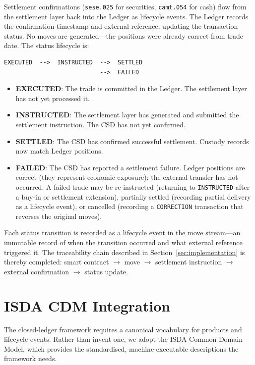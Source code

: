 \documentclass[11pt,a4paper]{article}
\begin{document}
Settlement confirmations (\texttt{sese.025} for securities, \texttt{camt.054} for cash) flow from the settlement layer back into the Ledger as lifecycle events. The Ledger records the confirmation timestamp and external reference, updating the transaction status. No moves are generated---the positions were already correct from trade date. The status lifecycle is:

\begin{lstlisting}
EXECUTED  -->  INSTRUCTED  -->  SETTLED
                           -->  FAILED
\end{lstlisting}

\begin{itemize}[nosep]
\item \textbf{EXECUTED}: The trade is committed in the Ledger. The settlement layer has not yet processed it.
\item \textbf{INSTRUCTED}: The settlement layer has generated and submitted the settlement instruction. The CSD has not yet confirmed.
\item \textbf{SETTLED}: The CSD has confirmed successful settlement. Custody records now match Ledger positions.
\item \textbf{FAILED}: The CSD has reported a settlement failure. Ledger positions are correct (they represent economic exposure); the external transfer has not occurred. A failed trade may be re-instructed (returning to \texttt{INSTRUCTED} after a buy-in or settlement extension), partially settled (recording partial delivery as a lifecycle event), or cancelled (recording a \texttt{CORRECTION} transaction that reverses the original moves).
\end{itemize}

\noindent Each status transition is recorded as a lifecycle event in the move stream---an immutable record of when the transition occurred and what external reference triggered it. The traceability chain described in Section~\ref{sec:implementation} is thereby completed: smart contract $\to$ move $\to$ settlement instruction $\to$ external confirmation $\to$ status update.

\clearpage
\section{ISDA CDM Integration}
\label{sec:cdm}

The closed-ledger framework requires a canonical vocabulary for products and lifecycle events. Rather than invent one, we adopt the ISDA Common Domain Model, which provides the standardised, machine-executable descriptions the framework needs.
\end{document}
